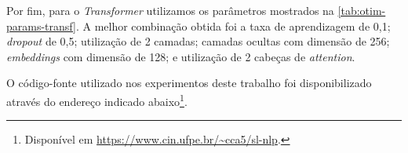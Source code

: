 


Por fim, para o \textit{Transformer} utilizamos os parâmetros mostrados na \autoref{tab:otim-params-transf}. A melhor combinação obtida foi a taxa de aprendizagem de 0,1; \textit{dropout} de 0,5; utilização de 2 camadas; camadas ocultas com dimensão de 256; \textit{embeddings} com dimensão de 128; e utilização de 2 cabeças de \textit{attention}.


O código-fonte utilizado nos experimentos deste trabalho foi disponibilizado através do endereço indicado abaixo\footnote{
    Disponível em \url{https://www.cin.ufpe.br/~cca5/sl-nlp}.
}.













